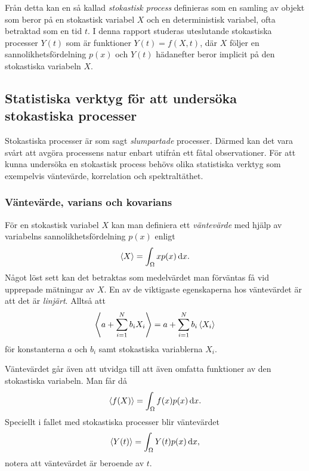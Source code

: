Från detta kan en så kallad \emph{stokastisk process} definieras som en
samling av objekt som beror på en stokastisk variabel $X$ och en
deterministisk variabel, ofta betraktad som en tid\footnotemark{}
$t$. I denna rapport studeras uteslutande stokastiska processer $Y(t)$ som är funktioner $Y(t) = f(X,t)$, där $X$ följer en sannolikhetsfördelning $p(x)$ och $Y(t)$ hädanefter beror implicit på den stokastiska variabeln $X$.

\subsection{Statistiska verktyg för att undersöka stokastiska processer}
Stokastiska processer är som sagt \emph{slumpartade} processer. Därmed kan
det vara svårt att avgöra processens natur enbart utifrån ett fåtal
observationer. För att kunna undersöka en stokastisk process
behövs olika statistiska verktyg som exempelvis väntevärde, korrelation och spektraltäthet.

\subsubsection{Väntevärde, varians och kovarians}
För en stokastisk variabel $X$ kan man definiera ett \emph{väntevärde} med hjälp av variabelns sannolikhetsfördelning $p(x)$ enligt
\begin{equation}\label{eq:EV}
    \ev{X} = \int_{\Omega} x p(x) \id{x}.
\end{equation}
Något löst sett kan det betraktas som medelvärdet man förväntas få vid
upprepade mätningar av $X$. En av de viktigaste egenskaperna hos väntevärdet är att det är \emph{linjärt}. Alltså att~\cite{Rice_matstat2006}
\begin{equation}\label{eq:EV_linkomb}
\ev{a+\sum_{i=1}^N b_i X_i} = a+\sum_{i=1}^N b_i \ev{X_i}
\end{equation}
för konstanterna $a$ och $b_i$ samt stokastiska variablerna $X_i$. 

Väntevärdet går även att utvidga till att även omfatta funktioner av
den stokastiska variabeln. Man får då~\cite{Rice_matstat2006}
\begin{equation}\label{eq:EV_f}
    \ev{f(X)} = \int_{\Omega} f(x) p(x) \id{x}.
\end{equation}
Speciellt i fallet med stokastiska processer blir väntevärdet 
\begin{equation}\label{eq:EV_process}
    \ev{Y(t)} = \int_{\Omega} Y(t)p(x) \id{x},
\end{equation}
notera att väntevärdet är beroende av $t$. 

